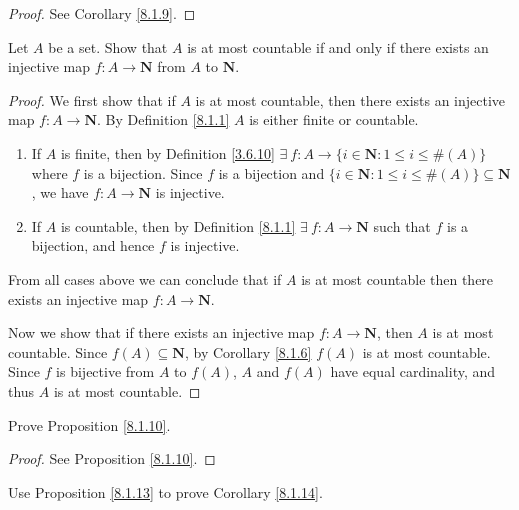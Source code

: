 \begin{proof}
    See Corollary \ref{8.1.9}.
\end{proof}

\begin{exercise}\label{ex 8.1.6}
    Let \(A\) be a set.
    Show that \(A\) is at most countable if and only if there exists an injective map \(f : A \to \mathbf{N}\) from \(A\) to \(\mathbf{N}\).
\end{exercise}

\begin{proof}
    We first show that if \(A\) is at most countable, then there exists an injective map \(f : A \to \mathbf{N}\).
    By Definition \ref{8.1.1} \(A\) is either finite or countable.
    \begin{enumerate}
        \item If \(A\) is finite, then by Definition \ref{3.6.10} \(\exists\ f : A \to \{i \in \mathbf{N} : 1 \leq i \leq \#(A)\}\) where \(f\) is a bijection.
              Since \(f\) is a bijection and \(\{i \in \mathbf{N} : 1 \leq i \leq \#(A)\} \subseteq \mathbf{N}\), we have \(f : A \to \mathbf{N}\) is injective.
        \item If \(A\) is countable, then by Definition \ref{8.1.1} \(\exists\ f : A \to \mathbf{N}\) such that \(f\) is a bijection, and hence \(f\) is injective.
    \end{enumerate}
    From all cases above we can conclude that if \(A\) is at most countable then there exists an injective map \(f : A \to \mathbf{N}\).

    Now we show that if there exists an injective map \(f : A \to \mathbf{N}\), then \(A\) is at most countable.
    Since \(f(A) \subseteq \mathbf{N}\), by Corollary \ref{8.1.6} \(f(A)\) is at most countable.
    Since \(f\) is bijective from \(A\) to \(f(A)\), \(A\) and \(f(A)\) have equal cardinality, and thus \(A\) is at most countable.
\end{proof}

\begin{exercise}\label{ex 8.1.7}
    Prove Proposition \ref{8.1.10}.
\end{exercise}

\begin{proof}
    See Proposition \ref{8.1.10}.
\end{proof}

\begin{exercise}\label{ex 8.1.8}
    Use Proposition \ref{8.1.13} to prove Corollary \ref{8.1.14}.
\end{exercise}

